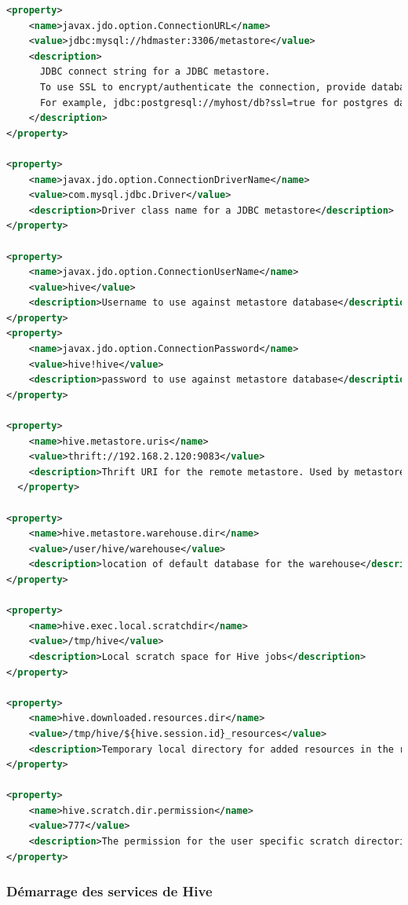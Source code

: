 \documentclass[12pt,english]{book}
\begin{document}
\begin{lstlisting}[language=XML, frame=single, breaklines=true, postbreak=\mbox{\textcolor{red}{$\hookrightarrow$}\space}]
<property>
    <name>javax.jdo.option.ConnectionURL</name>
    <value>jdbc:mysql://hdmaster:3306/metastore</value>
    <description>
      JDBC connect string for a JDBC metastore.
      To use SSL to encrypt/authenticate the connection, provide database-specific SSL flag in the connection URL.
      For example, jdbc:postgresql://myhost/db?ssl=true for postgres database.
    </description>
</property>

<property>
    <name>javax.jdo.option.ConnectionDriverName</name>
    <value>com.mysql.jdbc.Driver</value>
    <description>Driver class name for a JDBC metastore</description>
</property>

<property>
    <name>javax.jdo.option.ConnectionUserName</name>
    <value>hive</value>
    <description>Username to use against metastore database</description>
</property>
<property>
    <name>javax.jdo.option.ConnectionPassword</name>
    <value>hive!hive</value>
    <description>password to use against metastore database</description>
</property>

<property>
    <name>hive.metastore.uris</name>
    <value>thrift://192.168.2.120:9083</value>
    <description>Thrift URI for the remote metastore. Used by metastore client to connect to remote metastore.</description>
  </property>

<property>
    <name>hive.metastore.warehouse.dir</name>
    <value>/user/hive/warehouse</value>
    <description>location of default database for the warehouse</description>
</property>

<property>
    <name>hive.exec.local.scratchdir</name>
    <value>/tmp/hive</value>
    <description>Local scratch space for Hive jobs</description>
</property>

<property>
    <name>hive.downloaded.resources.dir</name>
    <value>/tmp/hive/${hive.session.id}_resources</value>
    <description>Temporary local directory for added resources in the remote file system.</description>
</property>

<property>
    <name>hive.scratch.dir.permission</name>
    <value>777</value>
    <description>The permission for the user specific scratch directories that get created.</description>
</property>
\end{lstlisting}

\subsubsection{Démarrage des services de Hive}
\end{document}
